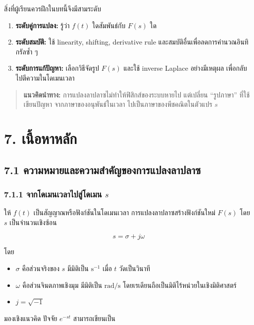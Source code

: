 สิ่งที่ผู้เรียนควรฝึกในบทนี้จึงมีสามระดับ

\begin{enumerate}
    \item \textbf{ระดับคู่การแปลง:} รู้ว่า $f(t)$ ใดสัมพันธ์กับ $F(s)$ ใด
    \item \textbf{ระดับสมบัติ:} ใช้ linearity, shifting, derivative rule และสมบัติอื่นเพื่อลดการคำนวณอินทิกรัลซ้ำ ๆ
    \item \textbf{ระดับการแก้ปัญหา:} เลือกวิธีจัดรูป $F(s)$ และใช้ inverse Laplace อย่างมีเหตุผล เพื่อกลับไปตีความในโดเมนเวลา
\end{enumerate}

\begin{quote}
\textbf{แนวคิดนำทาง:} การแปลงลาปลาซไม่ทำให้ฟิสิกส์ของระบบหายไป แต่เปลี่ยน “รูปภาษา” ที่ใช้เขียนปัญหา จากภาษาของอนุพันธ์ในเวลา ไปเป็นภาษาของพีชคณิตในตัวแปร $s$
\end{quote}



\section{7. เนื้อหาหลัก}

\subsection{7.1 ความหมายและความสำคัญของการแปลงลาปลาซ}

\subsubsection{\texorpdfstring{7.1.1 จากโดเมนเวลาไปสู่โดเมน $s$}{7.1.1 จากโดเมนเวลาไปสู่โดเมน s}}

ให้ $f(t)$ เป็นสัญญาณหรือฟังก์ชันในโดเมนเวลา การแปลงลาปลาซสร้างฟังก์ชันใหม่ $F(s)$ โดย $s$ เป็นจำนวนเชิงซ้อน

\[
s=\sigma+j\omega
\]

โดย

\begin{itemize}
    \item $\sigma$ คือส่วนจริงของ $s$ มีมิติเป็น $\mathrm{s}^{-1}$ เมื่อ $t$ วัดเป็นวินาที
    \item $\omega$ คือส่วนจินตภาพเชิงมุม มีมิติเป็น $\mathrm{rad/s}$ โดยเรเดียนถือเป็นมิติไร้หน่วยในเชิงมิติศาสตร์
    \item $j=\sqrt{-1}$
\end{itemize}

มองเชิงแนวคิด ปัจจัย $e^{-st}$ สามารถเขียนเป็น

